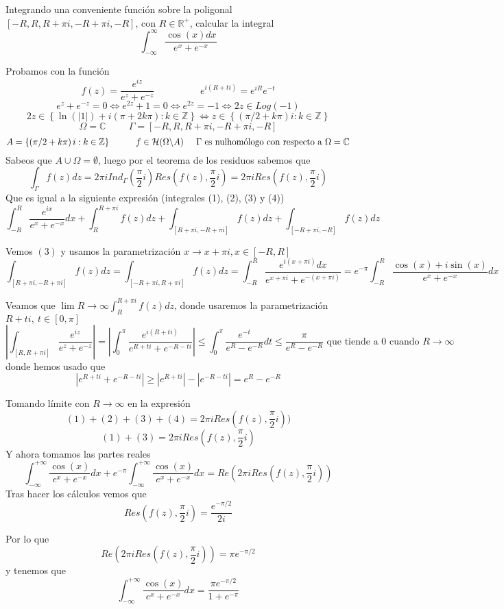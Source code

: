 \begin{ejer}
	Integrando una conveniente función sobre la poligonal $[-R,R,R+\pi i,-R+\pi i, -R]$, con $R\in\mathbb{R}^+$, calcular la integral
	$$ \int_{-\infty}^{\infty} \frac{\cos(x)dx}{e^x+e^{-x}} $$
\end{ejer}
\begin{sol}
	
	
	Probamos con la función
	$$ f(z) = \frac{e^{iz}}{e^z+e^{-z}} \hspace{2cm} e^{i(R+ti)} = e^{iR}e^{-t} $$
	$$ e^z+e^{-z} =0\Longleftrightarrow  e^{2z}+1=0 \Longleftrightarrow e^{2z}=-1 \Longleftrightarrow 2z\in Log(-1) $$
	$$ 2z\in\left\{ \ln(|1|) + i(\pi+2k\pi) : k\in\mathbb{Z} \right\} \Longleftrightarrow z\in\left\{ (\pi/2+k\pi)i : k\in\mathbb{Z} \right\} $$
	$$ \Omega=\mathbb{C} \hspace{1cm} \Gamma = [ -R,R,R+\pi i, -R+\pi i, -R ] $$
	$$ A = \left\{ \left( \pi/2 +k\pi \right)i : k\in\mathbb{Z} \right\} \hspace{1cm} f\in\mathcal{H}(\Omega\backslash A) \hspace{0.5cm} \Gamma \text{ es nulhomólogo con respecto a }\Omega=\mathbb{C} $$
	Sabeos que $A\cup\Omega = \emptyset$, luego por el teorema de los residuos sabemos que
	$$ \int_{\Gamma} f(z)dz = 2\pi iInd_{\Gamma}(\frac{\pi}{2}i) Res(f(z), \frac{\pi}{2}i) = 2\pi i Res(f(z), \frac{\pi}{2}i)$$
	Que es igual a la siguiente expresión (integrales (1), (2), (3) y (4))
	$$ \int_{-R}^{R} \frac{e^{ix}}{e^x+e^{-x}} dx + \int_{R}^{R+\pi i} f(z)dz + \int_{[R+\pi i,-R+\pi i]} f(z)dz + \int_{[-R+\pi i, -R]} f(z)dz $$
	
	Vemos $(3)$ y usamos la parametrización $x\rightarrow x+\pi i, x\in[-R,R]$
	$$ \int_{[R+\pi i,-R+\pi i]} f(z)dz = \int_{[-R+\pi i,R+\pi i]} f(z)dz = \int_{-R}^{R} \frac{e^{i(x+\pi i)}dx}{e^{x+\pi i}+e^{-(x+\pi i)}} = e^{-\pi} \int_{-R}^{R} \frac{\cos(x)+i\sin(x)}{e^x+e^{-x}}dx $$
	
	Veamos que $\lim{R\rightarrow\infty} \int_{R}^{R+\pi i} f(z)dz$, donde usaremos la parametrización $R+ti, \ t\in[0,\pi]$
	$$ \left| \int_{[R,R+\pi i]} \frac{e^{iz}}{e^z+e^{-z}} \right|  = \left| \int_{0}^{\pi} \frac{e^{i(R+ti)}}{e^{R+ti}+e^{-R-ti}} \right| \leq \int_{0}^{\pi} \frac{e^{-t}}{e^R-e^{-R}}dt \leq \frac{\pi}{e^R-e^{-R}} \text{ que tiende a $0$ cuando $R \rightarrow\infty$}$$
	donde hemos usado que
	$$ | e^{R+ti}+e^{-R-ti} | \geq |e^{R+ti}|-|e^{-R-ti}| = e^R-e^{-R} $$
	
	Tomando límite con $R\rightarrow\infty$ en la expresión
	$$ (1)+(2)+(3)+(4) = 2\pi i Res(f(z),\frac{\pi}{2}i)) $$
	$$ (1)+(3) = 2\pi iRes(f(z),\frac{\pi}{2}i) $$
	Y ahora tomamos las partes reales
	$$ \int_{-\infty}^{+\infty} \frac{\cos(x)}{e^x+e^{-x}} dx + e^{-\pi} \int_{-\infty}^{+\infty} \frac{\cos(x)}{e^x+e^{-x}}dx = Re(2\pi iRes(f(z), \frac{\pi}{2}i)) $$
	Tras hacer los cálculos vemos que
	$$ Res(f(z),\frac{\pi}{2}i) = \frac{e^{-\pi/2}}{2i}  $$
	
	Por lo que 
	$$ Re(2\pi iRes(f(z), \frac{\pi}{2}i)) = \pi e^{-\pi/2} $$
	y tenemos que
	$$ \int_{-\infty}^{+\infty} \frac{\cos(x)}{e^x+e^{-x}} dx = \frac{\pi e^{-\pi/2}}{1+e^{-\pi}} $$
\end{sol}



